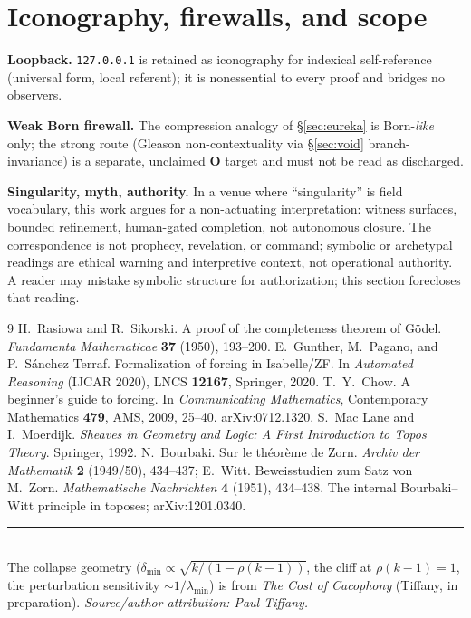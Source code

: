 \documentclass[11pt]{article}
\theoremstyle{definition}
\theoremstyle{remark}
\newcommand{\lmin}{\lambda_{\min}}
\begin{document}
\appendix
\section{Iconography, firewalls, and scope}\label{sec:appendix}

\noindent\textbf{Loopback.} \texttt{127.0.0.1} is retained as iconography for indexical self-reference
(universal form, local referent); it is nonessential to every proof and bridges no observers.

\noindent\textbf{Weak Born firewall.} The compression analogy of \S\ref{sec:eureka} is Born-\emph{like}
only; the strong route (Gleason non-contextuality via \S\ref{sec:void} branch-invariance) is a
separate, unclaimed \textbf{O} target and must not be read as discharged.

\noindent\textbf{Singularity, myth, authority.} In a venue where ``singularity'' is field vocabulary,
this work argues for a non-actuating interpretation: witness surfaces, bounded refinement, human-gated
completion, not autonomous closure. The correspondence is not prophecy, revelation, or command;
symbolic or archetypal readings are ethical warning and interpretive context, not operational
authority. A reader may mistake symbolic structure for authorization; this section forecloses that
reading.

\begin{thebibliography}{9}
 H.~Rasiowa and R.~Sikorski. A proof of the completeness theorem of
G\"odel. \emph{Fundamenta Mathematicae} \textbf{37} (1950), 193--200.
 E.~Gunther, M.~Pagano, and P.~S\'anchez Terraf. Formalization of forcing in
Isabelle/ZF. In \emph{Automated Reasoning} (IJCAR 2020), LNCS \textbf{12167}, Springer, 2020.
 T.~Y.~Chow. A beginner's guide to forcing. In \emph{Communicating Mathematics},
Contemporary Mathematics \textbf{479}, AMS, 2009, 25--40. arXiv:0712.1320.
 S.~Mac Lane and I.~Moerdijk. \emph{Sheaves in Geometry and Logic: A
First Introduction to Topos Theory}. Springer, 1992.
 N.~Bourbaki. Sur le th\'eor\`eme de Zorn. \emph{Archiv der Mathematik}
\textbf{2} (1949/50), 434--437; E.~Witt. Beweisstudien zum Satz von M.~Zorn. \emph{Mathematische
Nachrichten} \textbf{4} (1951), 434--438.
 The internal Bourbaki--Witt principle in toposes; arXiv:1201.0340.
\end{thebibliography}

\bigskip
\noindent\rule{\linewidth}{0.4pt}\\[0.3em]
\footnotesize
The collapse geometry ($\delta_{\min}\propto\sqrt{k/(1-\rho(k-1))}$, the cliff at $\rho(k-1)=1$,
the perturbation sensitivity $\sim 1/\lmin$) is from \emph{The Cost of Cacophony} (Tiffany, in
preparation). \emph{Source/author attribution: Paul Tiffany.}
\end{document}
